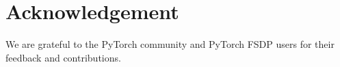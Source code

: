 \section{Acknowledgement}\label{sec:acknowledgement}

We are grateful to the PyTorch community and PyTorch FSDP users for their feedback and contributions.